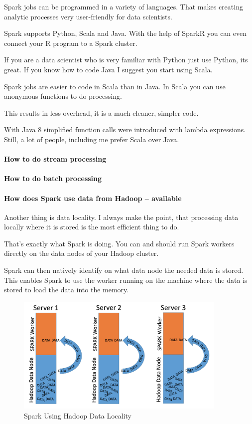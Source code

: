 \documentclass[12pt]{scrartcl} %
\begin{document}
Spark jobs can be programmed in a variety of languages. That makes creating analytic processes very user-friendly for data scientists.

Spark supports Python, Scala and Java. With the help of SparkR you can even connect your R program to a Spark cluster.

If you are a data scientist who is very familiar with Python just use Python, its great. If you know how to code Java I suggest you start using Scala.

Spark jobs are easier to code in Scala than in Java. In Scala you can use anonymous functions to do processing.

This results in less overhead, it is a much cleaner, simpler code.

With Java 8 simplified function calls were introduced with lambda expressions. Still, a lot of people, including me prefer Scala over Java.

\paragraph{How to do stream processing}
\paragraph{How to do batch processing}
\paragraph{How does Spark use data from Hadoop -- available}
Another thing is data locality. I always make the point, that processing data locally where it is stored is the most efficient thing to do.

That’s exactly what Spark is doing. You can and should run Spark workers directly on the data nodes of your Hadoop cluster.

Spark can then natively identify on what data node the needed data is stored. This enables Spark to use the worker running on the machine where the data is stored to load the data into the memory.

\begin{figure}[htbp] 
  \centering
     \includegraphics[width=0.9\textwidth]{images/Spark-Data-Locality}
  \caption{Spark Using Hadoop Data Locality}
  \label{fig:Bild1}
\end{figure}
\end{document}

